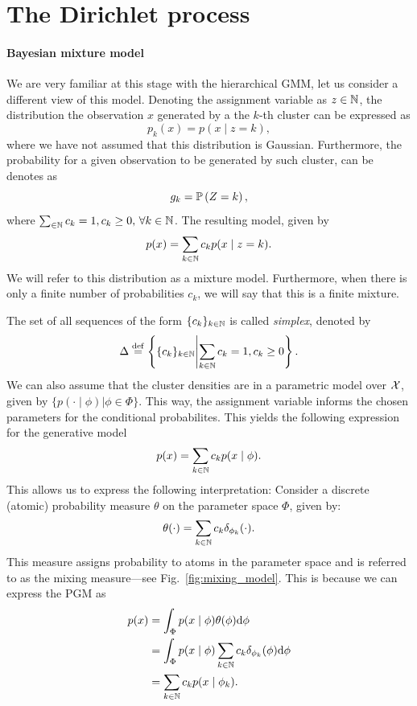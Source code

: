 \section{The Dirichlet process}

\paragraph{Bayesian mixture model} We are very familiar at this stage with the hierarchical GMM, let us consider a different view of this model. Denoting the assignment variable as $z\in{\mathbb N}$, the distribution the observation $x$ generated by a the $k$-th cluster can be expressed as 
\begin{equation}
    p_k(x) = p(x \mid z=k),
\end{equation}
where we have not assumed that this distribution is Gaussian. Furthermore, the probability for a given observation to be generated by such cluster, can be denotes as 
\begin{equation}
    g_k = \mathbb{P} \left(Z=k\right),
\end{equation}
where $\sum_{\in{\mathbb N}}c_k = 1, c_k\geq0,\, \forall k\in{\mathbb N}$. The resulting model, given by
\begin{equation}
p(x) = \sum_{k\in{\mathbb N}} c_k p(x \mid z=k).    
\end{equation}
We will refer to this distribution as a mixture model. Furthermore, when there is only a finite number of probabilities $c_k$, we will say that this is a finite mixture. 

The set of all sequences of the form $\{c_k\}_{k\in{\mathbb N}}$ is called \emph{simplex}, denoted by 
\begin{equation}
    \Delta \mathrel{\stackrel{\mathrm{def}}{=}} \left\{ \{c_k\}_{k\in{\mathbb N}} \middle| \sum_{k\in{\mathbb N}}c_k = 1, c_k\geq0 \right\}.
\end{equation}
We can also assume that the cluster densities are in a parametric model over ${\mathcal X}$, given by $\{p(\cdot \mid \phi) | \phi\in\Phi\}$. This way, the assignment variable informs the chosen parameters for the conditional probabilites. This yields the following expression for the generative model
\begin{equation}
    p(x) = \sum_{k\in{\mathbb N}} c_k p(x \mid \phi).    
\end{equation}
This allows us to express the following interpretation: Consider a discrete (atomic) probability measure $\theta$ on the parameter space $\Phi$, given by:
\begin{equation}
    \theta(\cdot) = \sum_{k\in{\mathbb N}} c_k \delta_{\phi_k}(\cdot). 
\end{equation}
This measure assigns probability to atoms in the parameter space and is referred to as the mixing measure---see Fig.~\ref{fig:mixing_model}. This is because we can express the PGM as
\begin{align}
    p(x) 
    &= \int_\Phi p(x \mid \phi) \theta(\phi){\text{d}}\phi\\
    &= \int_\Phi p(x \mid \phi) \sum_{k\in{\mathbb N}} c_k \delta_{\phi_k}(\phi){\text{d}}\phi\\
    &= \sum_{k\in{\mathbb N}}  c_k  p(x \mid \phi_k).
\end{align}

